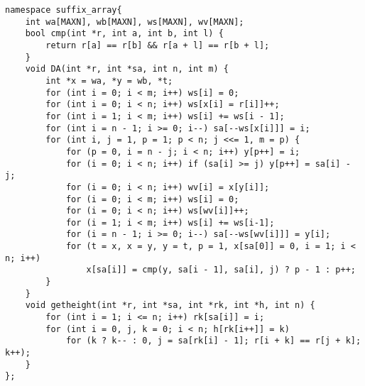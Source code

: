\begin{lstlisting}
namespace suffix_array{
	int wa[MAXN], wb[MAXN], ws[MAXN], wv[MAXN];
	bool cmp(int *r, int a, int b, int l) {
		return r[a] == r[b] && r[a + l] == r[b + l];
	}
	void DA(int *r, int *sa, int n, int m) {
		int *x = wa, *y = wb, *t;
		for (int i = 0; i < m; i++) ws[i] = 0;
		for (int i = 0; i < n; i++) ws[x[i] = r[i]]++;
		for (int i = 1; i < m; i++) ws[i] += ws[i - 1];
		for (int i = n - 1; i >= 0; i--) sa[--ws[x[i]]] = i;
		for (int i, j = 1, p = 1; p < n; j <<= 1, m = p) {
			for (p = 0, i = n - j; i < n; i++) y[p++] = i;
			for (i = 0; i < n; i++) if (sa[i] >= j) y[p++] = sa[i] - j;
			for (i = 0; i < n; i++) wv[i] = x[y[i]];
			for (i = 0; i < m; i++) ws[i] = 0;
			for (i = 0; i < n; i++) ws[wv[i]]++;
			for (i = 1; i < m; i++) ws[i] += ws[i-1];
			for (i = n - 1; i >= 0; i--) sa[--ws[wv[i]]] = y[i];
			for (t = x, x = y, y = t, p = 1, x[sa[0]] = 0, i = 1; i < n; i++)
				x[sa[i]] = cmp(y, sa[i - 1], sa[i], j) ? p - 1 : p++;
		}
	}
	void getheight(int *r, int *sa, int *rk, int *h, int n) {
		for (int i = 1; i <= n; i++) rk[sa[i]] = i;
		for (int i = 0, j, k = 0; i < n; h[rk[i++]] = k)
			for (k ? k-- : 0, j = sa[rk[i] - 1]; r[i + k] == r[j + k]; k++);
	}
};
\end{lstlisting}
